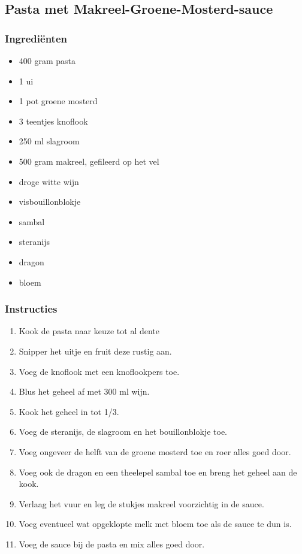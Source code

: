 \subsection{Pasta met Makreel-Groene-Mosterd-sauce}
\subsubsection*{Ingrediënten}
\begin{multicols}{2}
    \begin{itemize}
        \item 400 gram pasta
        \item 1 ui
        \item 1 pot groene mosterd
        \item 3 teentjes knoflook
        \item 250 ml slagroom
        \item 500 gram makreel, gefileerd op het vel
        \item droge witte wijn
        \item visbouillonblokje
        \item sambal
        \item steranijs
        \item dragon
        \item bloem
    \end{itemize}
\end{multicols}

\subsubsection*{Instructies}
\begin{multicols}{2}
    \begin{enumerate}
        \item Kook de pasta naar keuze tot al dente
        \item Snipper het uitje en fruit deze rustig aan.
        \item Voeg de knoflook met een knoflookpers toe.
        \item Blus het geheel af met 300 ml wijn.
        \item Kook het geheel in tot 1/3.
        \item Voeg de steranijs, de slagroom en het bouillonblokje toe.
        \item Voeg ongeveer de helft van de groene mosterd toe en roer alles goed door.
        \item Voeg ook de dragon en een theelepel sambal toe en breng het geheel aan de kook.
        \item Verlaag het vuur en leg de stukjes makreel voorzichtig in de sauce.
        \item Voeg eventueel wat opgeklopte melk met bloem toe als de sauce te dun is.
        \item Voeg de sauce bij de pasta en mix alles goed door.
    \end{enumerate}
\end{multicols}